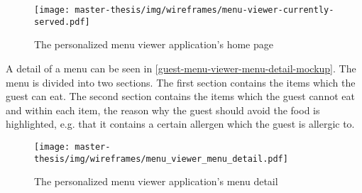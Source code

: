 \begin{figure}[h]
  \centering
  \texttt{[image: master-thesis/img/wireframes/menu-viewer-currently-served.pdf]}
  \caption{The personalized menu viewer application's home page}\label{guest-menu-viewer-currently-served-mockup}
\end{figure}

A detail of a menu can be seen in \autoref{guest-menu-viewer-menu-detail-mockup}.
The menu is divided into two sections.
The first section contains the items which the guest can eat.
The second section contains the items which the guest cannot eat and within each item, the reason why the guest should avoid the food is highlighted, e.g. that it contains a certain allergen which the guest is allergic to.

\begin{figure}[h]
  \centering
  \texttt{[image: master-thesis/img/wireframes/menu\_viewer\_menu\_detail.pdf]}
  \caption{The personalized menu viewer application's menu detail}\label{guest-menu-viewer-menu-detail-mockup}
\end{figure}
